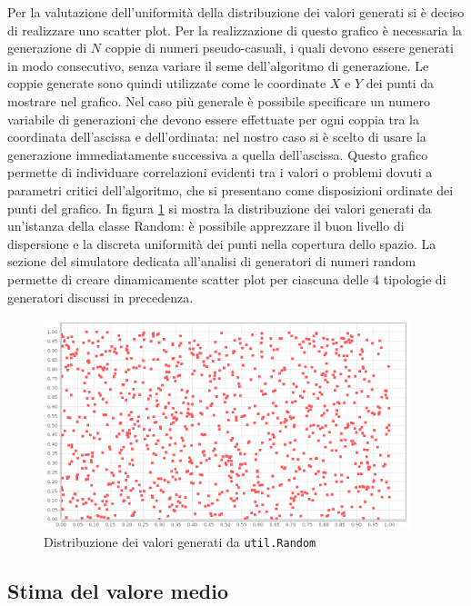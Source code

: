 Per la valutazione dell'uniformit\`a della distribuzione dei valori generati si \`e deciso di realizzare uno scatter plot. Per la realizzazione di questo grafico \`e necessaria la generazione di $N$ coppie di numeri pseudo-casuali, i quali devono essere generati in modo consecutivo, senza variare il seme dell'algoritmo di generazione. Le coppie generate sono quindi utilizzate come le coordinate $X$ e $Y$ dei punti da mostrare nel grafico. Nel caso pi\`u generale \`e possibile specificare un numero variabile di generazioni che devono essere effettuate per ogni coppia tra la coordinata dell'ascissa e dell'ordinata: nel nostro caso si \`e scelto di usare la generazione immediatamente successiva a quella dell'ascissa. Questo grafico permette di individuare correlazioni evidenti tra i valori o problemi dovuti a parametri critici dell'algoritmo, che si presentano come disposizioni ordinate dei punti del grafico.   In figura \ref{fig:random} si mostra la distribuzione dei valori generati da un'istanza della classe Random: \`e possibile apprezzare il buon livello di dispersione e la discreta uniformit\`a dei punti nella copertura dello spazio.
La sezione del simulatore dedicata all'analisi di generatori di numeri random permette di creare dinamicamente scatter plot per ciascuna delle 4 tipologie di generatori discussi in precedenza.



\begin{figure}[!h]{
	\begin{center}
	   \includegraphics[width=0.95\textwidth]{figures/random.png}
	\end{center}}
	\caption{Distribuzione dei valori generati da {\tt util.Random}}
	\label{fig:random}
\end{figure}


\subsection{Stima del valore medio}

